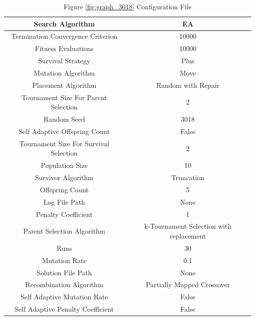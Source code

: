 \documentclass{standalone}
\begin{document}
\begin{table}[!htb]
	\centering
	\caption{Figure \ref{fig:graph_3018} Configuration File}
	\label{tab:graph_3018}
	\begin{tabular}{| c | c |}
		\hline
		Search Algorithm		& EA		 \\
		\hline
		Termination Convergence Criterion		& 10000		 \\
		\hline
		Fitness Evaluations		& 10000		 \\
		\hline
		Survival Strategy		& Plus		 \\
		\hline
		Mutation Algorithm		& Move		 \\
		\hline
		Placement Algorithm		& Random with Repair		 \\
		\hline
		Tournament Size For Parent Selection		& 2		 \\
		\hline
		Random Seed		& 3018		 \\
		\hline
		Self Adaptive Offspring Count		& False		 \\
		\hline
		Tournament Size For Survival Selection		& 2		 \\
		\hline
		Population Size		& 10		 \\
		\hline
		Survivor Algorithm		& Truncation		 \\
		\hline
		Offspring Count		& 5		 \\
		\hline
		Log File Path		& None		 \\
		\hline
		Penalty Coefficient		& 1		 \\
		\hline
		Parent Selection Algorithm		& k-Tournament Selection with replacement		 \\
		\hline
		Runs		& 30		 \\
		\hline
		Mutation Rate		& 0.1		 \\
		\hline
		Solution File Path		& None		 \\
		\hline
		Recombination Algorithm		& Partially Mapped Crossover		 \\
		\hline
		Self Adaptive Mutation Rate		& False		 \\
		\hline
		Self Adaptive Penalty Coefficient		& False		 \\
		\hline
	\end{tabular}
\end{table}
\end{document}
